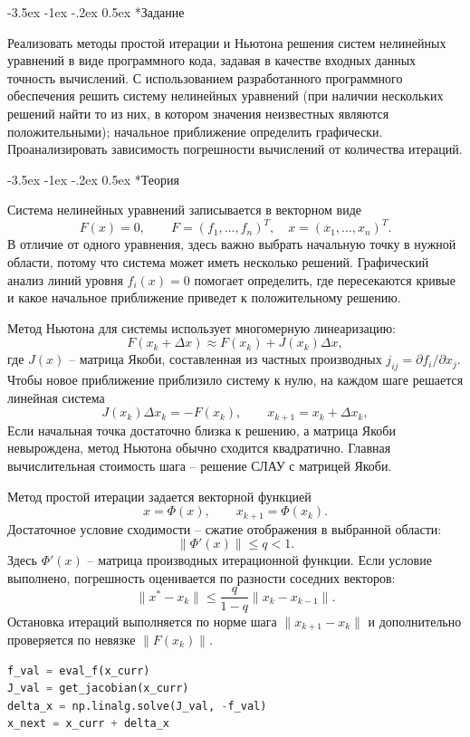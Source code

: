 \documentclass[14pt, a4paper]{article}
\makeatletter
\renewcommand\section{\@startsection {section}{1}{\parindent}%
  {-3.5ex \@plus -1ex \@minus -.2ex}%
  {0.5ex}%
  {\normalfont\Large\bfseries}}
\makeatother
\begin{document}
\section*{Задание}
Реализовать методы простой итерации и Ньютона решения систем нелинейных уравнений в виде программного кода, задавая в качестве входных данных точность вычислений. С использованием разработанного программного обеспечения решить систему нелинейных уравнений (при наличии нескольких решений найти то из них, в котором значения неизвестных являются положительными); начальное приближение определить графически. Проанализировать зависимость погрешности вычислений от количества итераций.

\section*{Теория}
Система нелинейных уравнений записывается в векторном виде
\[
    F(x)=0,\qquad F=(f_1,\ldots,f_n)^T,\quad x=(x_1,\ldots,x_n)^T.
\]
В отличие от одного уравнения, здесь важно выбрать начальную точку в нужной области, потому что система может иметь несколько решений. Графический анализ линий уровня $f_i(x)=0$ помогает определить, где пересекаются кривые и какое начальное приближение приведет к положительному решению.

Метод Ньютона для системы использует многомерную линеаризацию:
\[
    F(x_k+\Delta x)\approx F(x_k)+J(x_k)\Delta x,
\]
где $J(x)$ -- матрица Якоби, составленная из частных производных $j_{ij}=\partial f_i/\partial x_j$. Чтобы новое приближение приблизило систему к нулю, на каждом шаге решается линейная система
\[
    J(x_k)\Delta x_k=-F(x_k), \qquad x_{k+1}=x_k+\Delta x_k,
\]
Если начальная точка достаточно близка к решению, а матрица Якоби невырождена, метод Ньютона обычно сходится квадратично. Главная вычислительная стоимость шага -- решение СЛАУ с матрицей Якоби.

Метод простой итерации задается векторной функцией
\[
    x=\Phi(x), \qquad x_{k+1}=\Phi(x_k).
\]
Достаточное условие сходимости -- сжатие отображения в выбранной области:
\[
    \|\Phi'(x)\|\le q<1.
\]
Здесь $\Phi'(x)$ -- матрица производных итерационной функции. Если условие выполнено, погрешность оценивается по разности соседних векторов:
\[
    \|x^*-x_k\|\le\frac{q}{1-q}\|x_k-x_{k-1}\|.
\]
Остановка итераций выполняется по норме шага $\|x_{k+1}-x_k\|$ и дополнительно проверяется по невязке $\|F(x_k)\|$.

\begin{lstlisting}[language=Python]
f_val = eval_f(x_curr)
J_val = get_jacobian(x_curr)
delta_x = np.linalg.solve(J_val, -f_val)
x_next = x_curr + delta_x
\end{lstlisting}
\end{document}
